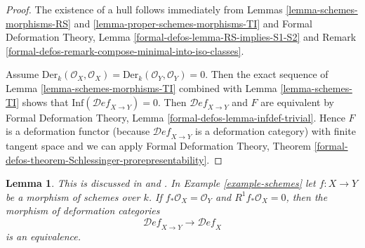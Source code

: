 \documentclass{stacks-project}
\newenvironment{reference}{\comment}{\endcomment}
\theoremstyle{plain}
\newtheorem{lemma}[subsection]{Lemma}
\theoremstyle{definition}
\theoremstyle{remark}
\numberwithin{equation}{subsection}
\def\Deformationcategory{\mathcal{D}\!\mathit{ef}}
\begin{document}
\begin{proof}
The existence of a hull follows immediately from
Lemmas \ref{lemma-schemes-morphisms-RS} and
\ref{lemma-proper-schemes-morphisms-TI} and
Formal Deformation Theory, Lemma \ref{formal-defos-lemma-RS-implies-S1-S2}
and Remark \ref{formal-defos-remark-compose-minimal-into-iso-classes}.

\medskip\noindent
Assume $\text{Der}_k(\mathcal{O}_X, \mathcal{O}_X) =
\text{Der}_k(\mathcal{O}_Y, \mathcal{O}_Y) = 0$. Then
the exact sequence of Lemma \ref{lemma-schemes-morphisms-TI}
combined with Lemma \ref{lemma-schemes-TI}
shows that $\text{Inf}(\Deformationcategory_{X \to Y}) = 0$.
Then $\Deformationcategory_{X \to Y}$ and $F$ are equivalent by
Formal Deformation Theory, Lemma \ref{formal-defos-lemma-infdef-trivial}.
Hence $F$ is a deformation functor (because
$\Deformationcategory_{X \to Y}$ is a
deformation category) with finite tangent space and we can apply
Formal Deformation Theory, Theorem
\ref{formal-defos-theorem-Schlessinger-prorepresentability}.
\end{proof}

\begin{lemma}
\label{lemma-schemes-morphisms-smooth-to-base}
\begin{reference}
This is discussed in \cite[Section 5.3]{Ravi-Murphys-Law} and
\cite[Theorem 3.3]{Ran-deformations}.
\end{reference}
In Example \ref{example-schemes} let $f : X \to Y$ be a morphism of schemes
over $k$. If $f_*\mathcal{O}_X = \mathcal{O}_Y$ and $R^1f_*\mathcal{O}_X = 0$,
then the morphism of deformation categories
$$
\Deformationcategory_{X \to Y} \to \Deformationcategory_X
$$
is an equivalence.
\end{lemma}
\end{document}
